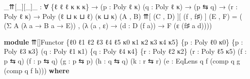 \documentclass[
  11pt,
  oneside,
  article]{memoir}
\newenvironment{Shaded}{}{}
\newcommand{\KeywordTok}[1]{\textcolor[rgb]{0.00,0.44,0.13}{\textbf{#1}}}
\newcommand{\NormalTok}[1]{#1}
\newcommand{\OtherTok}[1]{\textcolor[rgb]{0.00,0.44,0.13}{#1}}
\theoremstyle{definition}
\theoremstyle{plain}
\newcommand{\0}{\textsf{0}}
\newcommand{\1}{\tn{\textsf{1}}}
\begin{document}
\begin{Shaded}
\begin{Highlighting}[]
\OtherTok{\_}\NormalTok{⇈[}\OtherTok{\_}\NormalTok{][}\OtherTok{\_}\NormalTok{]}\OtherTok{\_} \OtherTok{:} \OtherTok{∀} \OtherTok{\{}\NormalTok{ℓ ℓ\textquotesingle{} ℓ\textquotesingle{}\textquotesingle{} κ κ\textquotesingle{} κ\textquotesingle{}\textquotesingle{}}\OtherTok{\}}
            \OtherTok{→} \OtherTok{(}\NormalTok{p }\OtherTok{:}\NormalTok{ Poly ℓ κ}\OtherTok{)} \OtherTok{(}\NormalTok{q }\OtherTok{:}\NormalTok{ Poly ℓ\textquotesingle{} κ\textquotesingle{}}\OtherTok{)}
            \OtherTok{→} \OtherTok{(}\NormalTok{p ⇆ q}\OtherTok{)} \OtherTok{→} \OtherTok{(}\NormalTok{r }\OtherTok{:}\NormalTok{ Poly ℓ\textquotesingle{}\textquotesingle{} κ\textquotesingle{}\textquotesingle{}}\OtherTok{)}
            \OtherTok{→}\NormalTok{ Poly }\OtherTok{(}\NormalTok{ℓ ⊔ κ ⊔ ℓ\textquotesingle{}\textquotesingle{}}\OtherTok{)} \OtherTok{(}\NormalTok{κ\textquotesingle{} ⊔ κ\textquotesingle{}\textquotesingle{}}\OtherTok{)}
\OtherTok{(}\NormalTok{A , B}\OtherTok{)}\NormalTok{ ⇈[ }\OtherTok{(}\NormalTok{C , D}\OtherTok{)}\NormalTok{ ][ }\OtherTok{(}\NormalTok{f , f♯}\OtherTok{)}\NormalTok{ ] }\OtherTok{(}\NormalTok{E , F}\OtherTok{)} \OtherTok{=}
   \OtherTok{(} \OtherTok{(}\NormalTok{Σ A }\OtherTok{(λ}\NormalTok{ a }\OtherTok{→}\NormalTok{ B a }\OtherTok{→}\NormalTok{ E}\OtherTok{))} 
\NormalTok{   , }\OtherTok{(λ} \OtherTok{(}\NormalTok{a , ε}\OtherTok{)} \OtherTok{→} \OtherTok{(}\NormalTok{d }\OtherTok{:}\NormalTok{ D }\OtherTok{(}\NormalTok{f a}\OtherTok{))} \OtherTok{→}\NormalTok{ F }\OtherTok{(}\NormalTok{ε }\OtherTok{(}\NormalTok{f♯ a d}\OtherTok{))))}

\KeywordTok{module}\NormalTok{ ⇈[]Functor }\OtherTok{\{}\NormalTok{ℓ0 ℓ1 ℓ2 ℓ3 ℓ4 ℓ5 κ0 κ1 κ2 κ3 κ4 κ5}\OtherTok{\}}
          \OtherTok{\{}\NormalTok{p }\OtherTok{:}\NormalTok{ Poly ℓ0 κ0}\OtherTok{\}} \OtherTok{\{}\NormalTok{p\textquotesingle{} }\OtherTok{:}\NormalTok{ Poly ℓ3 κ3}\OtherTok{\}}
          \OtherTok{(}\NormalTok{q }\OtherTok{:}\NormalTok{ Poly ℓ1 κ1}\OtherTok{)} \OtherTok{\{}\NormalTok{q\textquotesingle{} }\OtherTok{:}\NormalTok{ Poly ℓ4 κ4}\OtherTok{\}}
          \OtherTok{\{}\NormalTok{r }\OtherTok{:}\NormalTok{ Poly ℓ2 κ2}\OtherTok{\}} \OtherTok{(}\NormalTok{r\textquotesingle{} }\OtherTok{:}\NormalTok{ Poly ℓ5 κ5}\OtherTok{)}
          \OtherTok{(}\NormalTok{f }\OtherTok{:}\NormalTok{ p ⇆ q}\OtherTok{)} \OtherTok{(}\NormalTok{f\textquotesingle{} }\OtherTok{:}\NormalTok{ p\textquotesingle{} ⇆ q\textquotesingle{}}\OtherTok{)}
          \OtherTok{(}\NormalTok{g }\OtherTok{:}\NormalTok{ p ⇆ p\textquotesingle{}}\OtherTok{)} \OtherTok{(}\NormalTok{h }\OtherTok{:}\NormalTok{ q\textquotesingle{} ⇆ q}\OtherTok{)} \OtherTok{(}\NormalTok{k }\OtherTok{:}\NormalTok{ r ⇆ r\textquotesingle{}}\OtherTok{)}
          \OtherTok{(}\NormalTok{e }\OtherTok{:}\NormalTok{ EqLens q f }\OtherTok{(}\NormalTok{comp q g }\OtherTok{(}\NormalTok{comp q f\textquotesingle{} h}\OtherTok{)))} \KeywordTok{where}


\end{Highlighting}
\end{Shaded}
\end{document}
